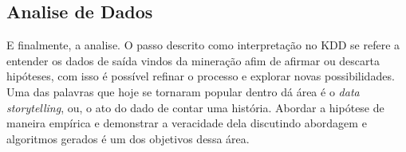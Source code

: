 \subsection{Analise de Dados}
E finalmente, a analise. O passo descrito como interpretação no KDD se refere a entender os dados de saída vindos da mineração afim de afirmar ou descarta hipóteses, com isso é possível refinar o processo e explorar novas possibilidades. Uma das palavras que hoje se tornaram popular dentro dá área é o \textit{data storytelling}, ou, o ato do dado de contar uma história. Abordar a hipótese de maneira empírica e demonstrar a veracidade dela discutindo abordagem e algoritmos gerados é um dos objetivos dessa área.

